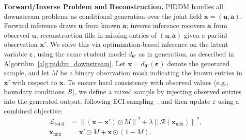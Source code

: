 \documentclass{article}
\theoremstyle{plain}
\theoremstyle{definition}
\theoremstyle{remark}
\def\va{{\bm{a}}}
\def\vu{{\bm{u}}}
\def\vx{{\bm{x}}}
\begin{document}
\noindent\textbf{Forward/Inverse Problem and Reconstruction.}
PIDDM handles all downstream problems as conditional generation over the joint field \(\vx=(\vu,\va)\). Forward inference draws \(\vu\) from known \(\va\); inverse inference recovers \(\va\) from observed \(\vu\); reconstruction fills in missing entries of \((\vu,\va)\) given a partial observation \(\vx'\). We solve this via optimization-based inference on the latent variable \(\boldsymbol{\varepsilon}\), using the same student model \(d_{\boldsymbol{\theta}'}\) as in generation, as described in Algorithm~\ref{alg:piddm_downstream}. Let \(\vx = d_{\boldsymbol{\theta}'}(\boldsymbol{\varepsilon})\) denote the generated sample, and let \(M\) be a binary observation mask indicating the known entries in \(\vx'\) with respect to $\vx$. To ensure hard consistency with observed values (e.g., boundary conditions \(\mathcal{B}\)), we define a mixed sample by injecting observed entries into the generated output, following ECI-sampling~\cite{cheng2025eci}, and then update $\varepsilon$ using a combined objective:
\begin{equation}\label{eq:hard_constraint}
\begin{aligned}
\mathcal{L}_{\text{total}} &= \left\| \left(\vx - \vx'\right) \odot M \right\|^2
    + \lambda \left\| \mathcal{R}(\vx_{\text{mix}}) \right\|^2, \\
\vx_{\text{mix}} &= \vx' \odot M + \vx \odot (1 - M).
\end{aligned}
\end{equation}
\end{document}
